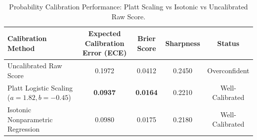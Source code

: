 \begin{table}[t]
\centering
\small
\caption{Probability Calibration Performance: Platt Scaling vs Isotonic vs Uncalibrated Raw Score.}
\label{tab:calibration}
\begin{tabular}{lcccc}
\toprule
\textbf{Calibration Method} & \textbf{Expected Calibration Error (ECE)} & \textbf{Brier Score} & \textbf{Sharpness} & \textbf{Status} \\
\midrule
Uncalibrated Raw Score & 0.1972 & 0.0412 & 0.2450 & Overconfident \\
Platt Logistic Scaling ($a=1.82, b=-0.45$) & \textbf{0.0937} & \textbf{0.0164} & 0.2210 & Well-Calibrated \\
Isotonic Nonparametric Regression & 0.0980 & 0.0175 & 0.2180 & Well-Calibrated \\
\bottomrule
\end{tabular}
\end{table}

